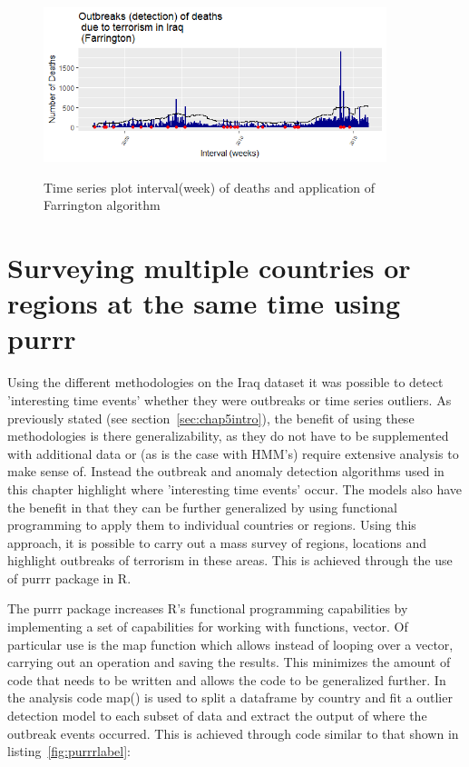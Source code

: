 \begin{figure}[t]
\includegraphics[width=10cm]{Peters_experiment_markdown_files/figure-latex/Rplot02_Farrington_detected_Outbreaks.png}
\label{fig:tseriesFarrington}
\centering
\caption{Time series plot interval(week) of deaths and application of Farrington algorithm}
\end{figure}

\section{Surveying multiple countries or regions at the same time using purrr}

Using the different methodologies on the Iraq dataset it was possible to detect 'interesting time events' whether they were outbreaks or time series outliers. As previously stated (see section~\ref{sec:chap5intro}), the benefit of using these methodologies is there generalizability, as they do not have to be supplemented with additional data or (as is the case with HMM's) require extensive analysis to make sense of. Instead the outbreak and anomaly detection algorithms used in this chapter highlight where 'interesting time events' occur. The models also have the benefit in that they can be further generalized by using functional programming to apply them to individual countries or regions. Using this approach, it is possible to carry out a mass survey of regions, locations and highlight outbreaks of terrorism in these areas. This is achieved through the use of purrr package \citep{purrrWickham2016} in R. 

The purrr package \citep{wickham2016r} increases R's functional programming capabilities by implementing a set of capabilities for working with functions, vector. Of particular use is the map function which allows instead of looping over a vector, carrying out an operation and saving the results. This minimizes the amount of code that needs to be written and allows the code to be generalized further. In the analysis code map() is used to split a dataframe by country and fit a outlier detection model to each subset of data and extract the output of where the outbreak events occurred. This is achieved through code similar to that shown in listing~\ref{fig:purrrlabel}: 

